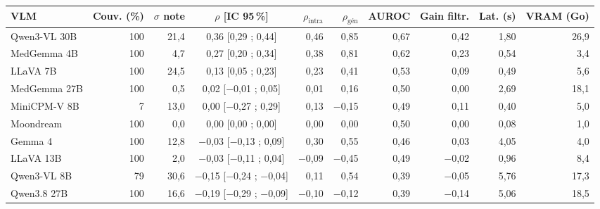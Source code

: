 \begin{tabular}{lrrcrrrrrr}
\toprule
VLM & Couv. (\%) & $\sigma$ note & $\rho$ [IC 95\,\%] & $\rho_\text{intra}$ & $\rho_\text{gén}$ & AUROC & Gain filtr. & Lat. (s) & VRAM (Go) \\
\midrule
Qwen3-VL 30B & 100 & 21,4 & 0,36 [0,29 ; 0,44] & 0,46 & 0,85 & 0,67 & 0,42 & 1,80 & 26,9 \\
MedGemma 4B & 100 & 4,7 & 0,27 [0,20 ; 0,34] & 0,38 & 0,81 & 0,62 & 0,23 & 0,54 & 3,4 \\
LLaVA 7B & 100 & 24,5 & 0,13 [0,05 ; 0,23] & 0,23 & 0,41 & 0,53 & 0,09 & 0,49 & 5,6 \\
MedGemma 27B & 100 & 0,5 & 0,02 [$-$0,01 ; 0,05] & 0,01 & 0,16 & 0,50 & 0,00 & 2,69 & 18,1 \\
MiniCPM-V 8B & 7 & 13,0 & 0,00 [$-$0,27 ; 0,29] & 0,13 & $-$0,15 & 0,49 & 0,11 & 0,40 & 5,0 \\
Moondream & 100 & 0,0 & 0,00 [0,00 ; 0,00] & 0,00 & 0,00 & 0,50 & 0,00 & 0,08 & 1,0 \\
Gemma 4 & 100 & 12,8 & $-$0,03 [$-$0,13 ; 0,09] & 0,30 & 0,55 & 0,46 & 0,03 & 4,05 & 4,0 \\
LLaVA 13B & 100 & 2,0 & $-$0,03 [$-$0,11 ; 0,04] & $-$0,09 & $-$0,45 & 0,49 & $-$0,02 & 0,96 & 8,4 \\
Qwen3-VL 8B & 79 & 30,6 & $-$0,15 [$-$0,24 ; $-$0,04] & 0,11 & 0,54 & 0,39 & $-$0,05 & 5,76 & 17,3 \\
Qwen3.8 27B & 100 & 16,6 & $-$0,19 [$-$0,29 ; $-$0,09] & $-$0,10 & $-$0,12 & 0,39 & $-$0,14 & 5,06 & 18,5 \\
\bottomrule
\end{tabular}
